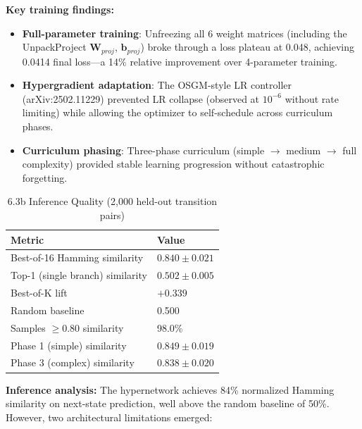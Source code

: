 \documentclass[10pt]{article}
\begin{document}
\noindent\textbf{Key training findings:}
\begin{itemize}
\item \textbf{Full-parameter training}: Unfreezing all 6 weight matrices (including the UnpackProject $\mathbf{W}_{proj}$, $\mathbf{b}_{proj}$) broke through a loss plateau at 0.048, achieving 0.0414 final loss---a 14\% relative improvement over 4-parameter training.
\item \textbf{Hypergradient adaptation}: The OSGM-style LR controller (arXiv:2502.11229) prevented LR collapse (observed at $10^{-6}$ without rate limiting) while allowing the optimizer to self-schedule across curriculum phases.
\item \textbf{Curriculum phasing}: Three-phase curriculum (simple $\to$ medium $\to$ full complexity) provided stable learning progression without catastrophic forgetting.
\end{itemize}

\begin{table}[h]
\begin{center}
\captionsetup{labelformat=empty}
\caption{6.3b Inference Quality (2,000 held-out transition pairs)}
\begin{tabular}{|l|l|}
\hline
Metric & Value \\
\hline
Best-of-16 Hamming similarity & $0.840 \pm 0.021$ \\
\hline
Top-1 (single branch) similarity & $0.502 \pm 0.005$ \\
\hline
Best-of-K lift & $+0.339$ \\
\hline
Random baseline & 0.500 \\
\hline
Samples $\geq 0.80$ similarity & 98.0\% \\
\hline
Phase 1 (simple) similarity & $0.849 \pm 0.019$ \\
\hline
Phase 3 (complex) similarity & $0.838 \pm 0.020$ \\
\hline
\end{tabular}
\end{center}
\end{table}

\noindent\textbf{Inference analysis:} The hypernetwork achieves 84\% normalized Hamming similarity on next-state prediction, well above the random baseline of 50\%. However, two architectural limitations emerged:
\end{document}
